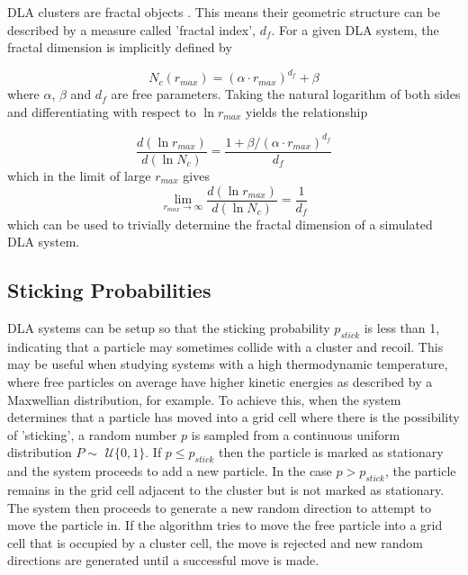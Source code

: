 \documentclass[11pt]{iopart}
\begin{document}
DLA clusters are fractal objects \cite{dla}. This means their geometric structure can be described by a measure called 'fractal index', $d_f$. For a given DLA system, the fractal dimension is implicitly defined by \cite{handout}

\begin{equation}
N_c(r_{max}) = (\alpha \cdot r_{max})^{d_f} + \beta
\end{equation} 
where $\alpha$, $\beta$ and $d_f$ are free parameters.
Taking the natural logarithm of both sides and differentiating with respect to $\ln r_{max}$ yields the relationship

\begin{equation}
\frac{d(\ln r_{max})}{d(\ln N_c)} = \frac{1 + \beta/(\alpha \cdot r_{max})^{d_f}}{d_f}
\end{equation} 
which in the limit of large $r_{max}$ gives
\begin{equation}
\label{dflogequation}
\lim_{r_{max}\to\infty} \frac{d(\ln r_{max})}{d(\ln N_c)}  = \frac{1}{d_f}
\end{equation}
which can be used to trivially determine the fractal dimension of a simulated DLA system.

\subsection{Sticking Probabilities}

DLA systems can be setup so that the sticking probability $p_{stick}$ is less than 1, indicating that a particle may sometimes collide with a cluster and recoil. This may be useful when studying systems with a high thermodynamic temperature, where free particles on average have higher kinetic energies as described by a Maxwellian distribution, for example. To achieve this, when the system determines that a particle has moved into a grid cell where there is the possibility of 'sticking', a random number $p$ is sampled from a continuous uniform distribution $P \sim$ $\mathcal{U}\{0, 1\}$. If $p \leq p_{stick}$ then the particle is marked as stationary and the system proceeds to add a new particle. In the case $p > p_{stick}$, the particle remains in the grid cell adjacent to the cluster but is not marked as stationary. The system then proceeds to generate a new random direction to attempt to move the particle in. If the algorithm tries to move the free particle into a grid cell that is occupied by a cluster cell, the move is rejected and new random directions are generated until a successful move is made.
\end{document}
